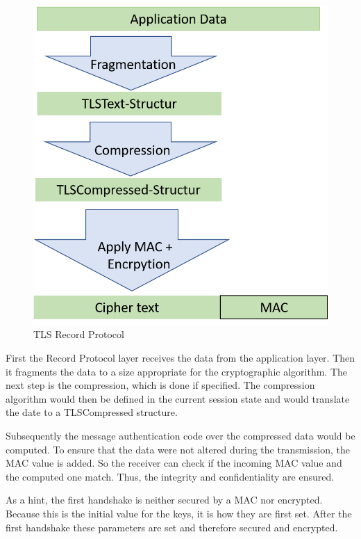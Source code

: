 \begin{figure}[H]
	\centering
		\includegraphics[scale=0.5]{images/tls_recordprotocol.png}
	\caption{TLS Record Protocol}
	\label{fig:tls_recordprotocol}
\end{figure}

First the Record Protocol layer receives the data from the application layer. Then it fragments the data to a size appropriate for the cryptographic algorithm. 
The next step is the compression, which is done if specified. The compression algorithm would then be defined in the current session state and would translate the date to a TLSCompressed structure.
 
Subsequently the message authentication code over the compressed data would be computed.
To ensure that the data were not altered during the transmission, the MAC value is added. So the receiver can check if the incoming MAC value and the computed one 
match. Thus, the integrity and confidentiality are ensured.

As a hint, the first handshake is neither secured by a MAC nor encrypted. Because this is the initial value for the keys, it is how they are first set. After the first handshake these parameters are set and therefore secured and encrypted.
\cite{ms:Record}
